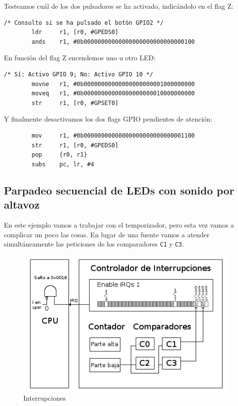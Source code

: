 Testeamos cuál de los dos pulsadores se ha activado, indicándolo en el flag Z:

\begin{lstlisting}
/* Consulto si se ha pulsado el botón GPIO2 */
        ldr     r1, [r0, #GPEDS0]
        ands    r1, #0b00000000000000000000000000000100
\end{lstlisting}

En función del flag Z encendemos uno u otro LED:

\begin{lstlisting}
/* Sí: Activo GPIO 9; No: Activo GPIO 10 */
        movne   r1, #0b00000000000000000000001000000000
        moveq   r1, #0b00000000000000000000010000000000
        str     r1, [r0, #GPSET0]
\end{lstlisting}

Y finalmente desactivamos los dos flags GPIO pendientes de atención:

\begin{lstlisting}
        mov     r1, #0b00000000000000000000000000001100
        str     r1, [r0, #GPEDS0]
        pop     {r0, r1}
        subs    pc, lr, #4
\end{lstlisting}

\subsection{Parpadeo secuencial de LEDs con sonido por altavoz}

En este ejemplo vamos a trabajar con el temporizador, pero esta vez vamos a complicar
un poco las cosas. En lugar de una fuente vamos a atender simultáneamente las peticiones
de los comparadores {\tt C1} y {\tt C3}.

\begin{figure}[h]
  \centering
    \includegraphics[width=14cm]{graphs/inter4.png}
  \caption{Interrupciones}
  \label{fig:inter4}
\end{figure}

